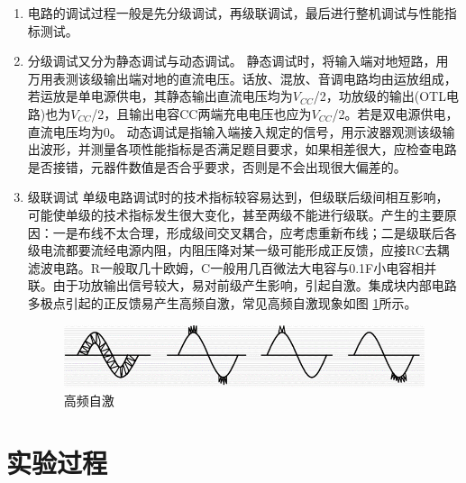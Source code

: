 \documentclass[a4paper]{article}
\theoremstyle{definition}
\theoremstyle{plain}
\theoremstyle{remark}
\newcommand{\reffig}[1]{图 \ref{#1}}
\begin{document}
\begin{enumerate}

	\item 电路的调试过程一般是先分级调试，再级联调试，最后进行整机调试与性能指标测试。
	\item 分级调试又分为静态调试与动态调试。
	      静态调试时，将输入端对地短路，用万用表测该级输出端对地的直流电压。话放、混放、音调电路均由运放组成，若运放是单电源供电，其静态输出直流电压均为$V_{CC}$/2，功放级的输出(OTL电路)也为$V_{CC}$/2，且输出电容CC两端充电电压也应为$V_{CC}$/2。若是双电源供电，直流电压均为0。
	      动态调试是指输入端接入规定的信号，用示波器观测该级输出波形，并测量各项性能指标是否满足题目要求，如果相差很大，应检查电路是否接错，元器件数值是否合乎要求，否则是不会出现很大偏差的。
	\item 级联调试
	      单级电路调试时的技术指标较容易达到，但级联后级间相互影响，可能使单级的技术指标发生很大变化，甚至两级不能进行级联。产生的主要原因：一是布线不太合理，形成级间交叉耦合，应考虑重新布线；二是级联后各级电流都要流经电源内阻，内阻压降对某一级可能形成正反馈，应接RC去耦滤波电路。R一般取几十欧姆，C一般用几百微法大电容与0.1F小电容相并联。由于功放输出信号较大，易对前级产生影响，引起自激。集成块内部电路多极点引起的正反馈易产生高频自激，常见高频自激现象如\reffig{高频自激}所示。
	      \vspace{1em}
	      \begin{figure}[H]
		      \centering
		      \includegraphics[width=1\textwidth]{高频自激.png}
		      \caption{高频自激}
		      \label{高频自激}
	      \end{figure}
\end{enumerate}

\section{实验过程}
\end{document}
